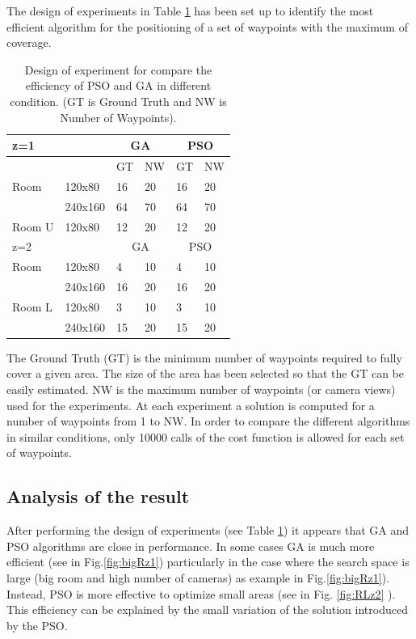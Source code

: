 The design of experiments in Table \ref{table:table1} has been set up to identify the most efficient algorithm for the positioning of a set of waypoints with the maximum of coverage. 


\begin{table}[!htb]
\begin{tabular}{|l|l|l|l|l|l|}
  \hline
  \multicolumn{2}{|l|}{z=1 } &\multicolumn{2}{|c|}{GA}  & \multicolumn{2}{|c|}{PSO} \\  \hline
  \multicolumn{2}{|c|}{ } & GT & NW & GT & NW\\ \hline
  Room &  120x80 & 16 &20 & 16 & 20\\ \cline{2-6}
     &  240x160 & 64 &70 & 64 & 70 \\ \hline
  Room U &  120x80 & 12 &20 & 12 & 20\\ \hline
  \multicolumn{2}{|l|}{z=2 } &\multicolumn{2}{|c|}{GA}  & \multicolumn{2}{|c|}{PSO} \\  \hline
 Room &  120x80 & 4 &10 & 4 & 10\\ \cline{2-6}
     &  240x160 & 16 &20 & 16 & 20 \\ \hline
 Room L&  120x80 & 3 &10 & 3 & 10\\ \cline{2-6}
     &  240x160 & 15 &20 & 15 & 20 \\ \hline
\end{tabular}
\caption{Design of experiment for compare the efficiency of PSO and GA in different condition.  (GT is Ground Truth and NW is Number of Waypoints).}\label{table:table1}
\end{table}
The Ground Truth (GT) is the minimum number of waypoints required to fully cover a given area. The size of the area has been selected so that the GT can be easily estimated. NW is the maximum number of waypoints (or camera views) used for the experiments. At each experiment a solution is computed for a number of waypoints from 1 to NW. In order to compare the different algorithms in similar conditions, only 10000 calls of the cost function is allowed for each set of waypoints.

\subsection{ Analysis of the result}
After performing the design of experiments (see Table \ref{table:table1}) it appears that GA and PSO algorithms are close in performance. In some cases GA is much more efficient (see in Fig.\ref{fig:bigRz1}) particularly in the case where the search space is large (big room and high number of cameras)  as example in Fig.\ref{fig:bigRz1}). Instead, PSO is more effective to optimize small areas (see in Fig. \ref{fig:RLz2} ).
This efficiency can be explained by the small variation of the solution introduced by the PSO. 


